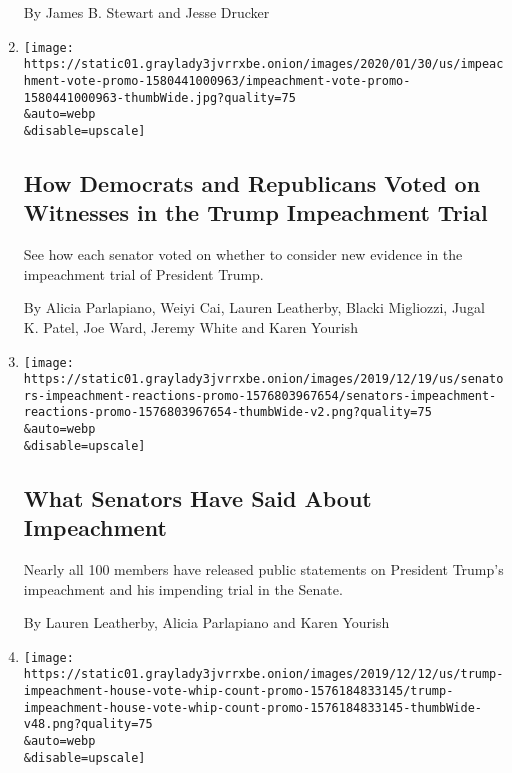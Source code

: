 \begin{enumerate}
  By James B. Stewart and Jesse Drucker
\item
  \href{/interactive/2020/01/31/us/politics/impeachment-vote.html}{}

  \texttt{[image: https://static01.graylady3jvrrxbe.onion/images/2020/01/30/us/impeachment-vote-promo-1580441000963/impeachment-vote-promo-1580441000963-thumbWide.jpg?quality=75\\\&auto=webp\\\&disable=upscale]}

  \hypertarget{how-democrats-and-republicans-voted-on-witnesses-in-the-trump-impeachment-trial}{%
  \subsection{How Democrats and Republicans Voted on Witnesses in the
  Trump Impeachment
  Trial}\label{how-democrats-and-republicans-voted-on-witnesses-in-the-trump-impeachment-trial}}

  See how each senator voted on whether to consider new evidence in the
  impeachment trial of President Trump.

  By Alicia Parlapiano, Weiyi Cai, Lauren Leatherby, Blacki Migliozzi,
  Jugal K. Patel, Joe Ward, Jeremy White and Karen Yourish
\item
  \href{/interactive/2019/12/20/us/politics/senators-impeachment-reactions.html}{}

  \texttt{[image: https://static01.graylady3jvrrxbe.onion/images/2019/12/19/us/senators-impeachment-reactions-promo-1576803967654/senators-impeachment-reactions-promo-1576803967654-thumbWide-v2.png?quality=75\\\&auto=webp\\\&disable=upscale]}

  \hypertarget{what-senators-have-said-about-impeachment}{%
  \subsection{What Senators Have Said About
  Impeachment}\label{what-senators-have-said-about-impeachment}}

  Nearly all 100 members have released public statements on President
  Trump's impeachment and his impending trial in the Senate.

  By Lauren Leatherby, Alicia Parlapiano and Karen Yourish
\item
  \href{/interactive/2019/12/12/us/politics/trump-impeachment-house-vote-whip-count.html}{}

  \texttt{[image: https://static01.graylady3jvrrxbe.onion/images/2019/12/12/us/trump-impeachment-house-vote-whip-count-promo-1576184833145/trump-impeachment-house-vote-whip-count-promo-1576184833145-thumbWide-v48.png?quality=75\\\&auto=webp\\\&disable=upscale]}


\end{enumerate}
